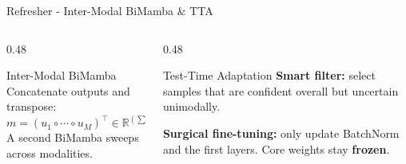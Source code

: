 \documentclass[aspectratio=169]{beamer}
\newcommand{\hl}[1]{\textcolor{coolpurple}{\textbf{#1}}}
\newcommand{\R}{\mathbb{R}}
\begin{document}
	\begin{frame}{Refresher - Inter-Modal BiMamba \& TTA}
		\begin{columns}[onlytextwidth]
			\begin{column}{0.48\textwidth}
				\begin{block}{Inter-Modal BiMamba}
					\small
					Concatenate outputs and transpose:
					$$ m = (u_1 \circ \cdots \circ u_M)^\top \in \R^{(\sum C_i') \times L'} $$
					A second BiMamba sweeps across modalities.
				\end{block}
			\end{column}
			\begin{column}{0.48\textwidth}
				\begin{block}{Test-Time Adaptation}
					\small
					\textbf{Smart filter:} select samples that are confident overall but uncertain unimodally.
					
					\textbf{Surgical fine-tuning:} only update BatchNorm and the first layers. Core weights stay \hl{frozen}.
				\end{block}
			\end{column}
		\end{columns}
		\vspace{0.5em}
		\begin{center}
		\end{center}
	\end{frame}
	
\end{document}
